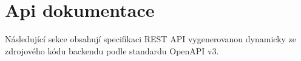 \section{Api dokumentace}

Následující sekce obsahují specifikaci REST API vygenerovanou dynamicky ze zdrojového kódu backendu podle standardu OpenAPI v3.

